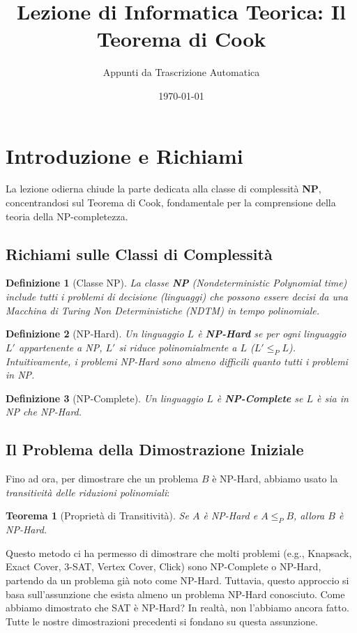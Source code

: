 \documentclass[a4paper]{article}
\title{Lezione di Informatica Teorica: Il Teorema di Cook}
\author{Appunti da Trascrizione Automatica}
\date{\today}
\newtheorem{theorem}{Teorema}
\newtheorem{definition}{Definizione}
\begin{document}
\maketitle
\tableofcontents
\newpage

\section{Introduzione e Richiami}

La lezione odierna chiude la parte dedicata alla classe di complessità \textbf{NP}, concentrandosi sul Teorema di Cook, fondamentale per la comprensione della teoria della NP-completezza.

\subsection{Richiami sulle Classi di Complessità}

\begin{definition}[Classe NP]
La classe \textbf{NP} (Nondeterministic Polynomial time) include tutti i problemi di decisione (linguaggi) che possono essere decisi da una \emph{Macchina di Turing Non Deterministiche (NDTM)} in tempo polinomiale.
\end{definition}

\begin{definition}[NP-Hard]
Un linguaggio $L$ è \textbf{NP-Hard} se per ogni linguaggio $L'$ appartenente a NP, $L'$ si riduce polinomialmente a $L$ ($L' \le_P L$). Intuitivamente, i problemi NP-Hard sono \textit{almeno difficili quanto} tutti i problemi in NP.
\end{definition}

\begin{definition}[NP-Complete]
Un linguaggio $L$ è \textbf{NP-Complete} se $L$ è sia in NP che NP-Hard.
\end{definition}

\subsection{Il Problema della Dimostrazione Iniziale}
Fino ad ora, per dimostrare che un problema $B$ è NP-Hard, abbiamo usato la \emph{transitività delle riduzioni polinomiali}:
\begin{theorem}[Proprietà di Transitività]
Se $A$ è NP-Hard e $A \le_P B$, allora $B$ è NP-Hard.
\end{theorem}
Questo metodo ci ha permesso di dimostrare che molti problemi (e.g., Knapsack, Exact Cover, 3-SAT, Vertex Cover, Click) sono NP-Complete o NP-Hard, partendo da un problema già noto come NP-Hard.
Tuttavia, questo approccio si basa sull'assunzione che esista almeno un problema NP-Hard conosciuto. Come abbiamo dimostrato che SAT è NP-Hard? In realtà, non l'abbiamo ancora fatto. Tutte le nostre dimostrazioni precedenti si fondano su questa assunzione.
\end{document}
